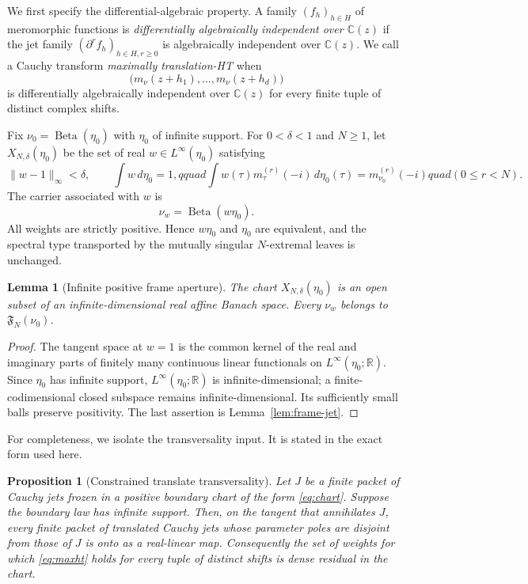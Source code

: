 \documentclass[11pt]{article}
\newtheorem{proposition}[theorem]{Proposition}
\newtheorem{lemma}[theorem]{Lemma}
\newcommand{\C}{\mathbb C}
\newcommand{\R}{\mathbb R}
\newcommand{\D}{\partial}
\newcommand{\Beta}{\operatorname{Beta}}
\begin{document}
We first specify the differential-algebraic property.  A family $(f_h)_{h\in H}$ of meromorphic
functions is \emph{differentially algebraically independent over $\C(z)$} if the jet family
$(\D^rf_h)_{h\in H,r\geq0}$ is algebraically independent over $\C(z)$.  We call a Cauchy
transform \emph{maximally translation-HT} when
\begin{equation}\label{eq:maxht}
  \bigl(m_\nu(z+h_1),\ldots,m_\nu(z+h_d)\bigr)
\end{equation}
is differentially algebraically independent over $\C(z)$ for every finite tuple of distinct
complex shifts.

Fix $\nu_0=\Beta(\eta_0)$ with $\eta_0$ of infinite support.  For $0<\delta<1$ and $N\geq1$,
let $X_{N,\delta}(\eta_0)$ be the set of real $w\in L^\infty(\eta_0)$ satisfying
\begin{equation}\label{eq:chart}
  \|w-1\|_\infty<\delta,\qquad
  \int w\,d\eta_0=1,qquad
  \int w(\tau)m_\tau^{(r)}(-i)\,d\eta_0(\tau)
   =m_{\nu_0}^{(r)}(-i)quad(0\leq r<N).
\end{equation}
The carrier associated with $w$ is
\begin{equation}\label{eq:weighted-carrier}
  \nu_w=\Beta(w\eta_0).
\end{equation}
All weights are strictly positive.  Hence $w\eta_0$ and $\eta_0$ are equivalent, and the spectral
type transported by the mutually singular $N$-extremal leaves is unchanged.

\begin{lemma}[Infinite positive frame aperture]\label{lem:aperture}
The chart $X_{N,\delta}(\eta_0)$ is an open subset of an infinite-dimensional real affine Banach
space.  Every $\nu_w$ belongs to $\mathfrak F_N(\nu_0)$.
\end{lemma}

\begin{proof}
The tangent space at $w=1$ is the common kernel of the real and imaginary parts of finitely many
continuous linear functionals on $L^\infty(\eta_0;\R)$.  Since $\eta_0$ has infinite support,
$L^\infty(\eta_0;\R)$ is infinite-dimensional; a finite-codimensional closed subspace remains
infinite-dimensional.  Its sufficiently small balls preserve positivity.  The last assertion is
Lemma~\ref{lem:frame-jet}.
\end{proof}

For completeness, we isolate the transversality input.  It is stated in the exact form used here.

\begin{proposition}[Constrained translate transversality]\label{prop:transversality}
Let $J$ be a finite packet of Cauchy jets frozen in a positive boundary chart of the form
\eqref{eq:chart}.  Suppose the boundary law has infinite support.  Then, on the tangent that
annihilates $J$, every finite packet of translated Cauchy jets whose parameter poles are disjoint
from those of $J$ is onto as a real-linear map.  Consequently the set of weights for which
\eqref{eq:maxht} holds for every tuple of distinct shifts is dense residual in the chart.
\end{proposition}
\end{document}
